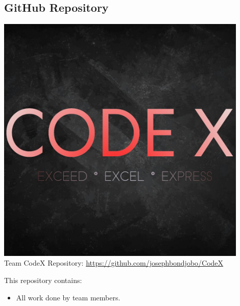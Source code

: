 \documentclass[a4paper,10pt]{article}
\begin{document}
\subsection {GitHub Repository}
\includegraphics[width=12cm]{CodeX_logo.jpg} \\
Team CodeX Repository: \url{https://github.com/josephbondjobo/CodeX}

This repository contains:
\begin{itemize}
\item All work done by team members.
\end{itemize}



\newpage
\clearpage
{}
\end{document}
